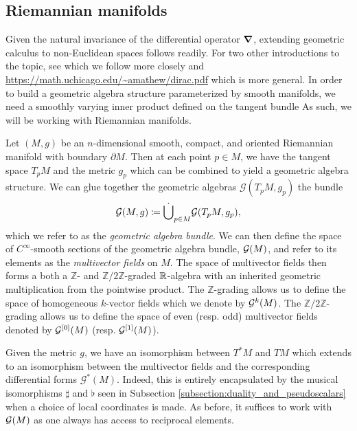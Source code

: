 \documentclass[12pt]{article}
\begin{document}

\subsection{Riemannian manifolds}


Given the natural invariance of the differential operator $\boldsymbol{\nabla}$, extending geometric calculus to non-Euclidean spaces follows readily.  For two other introductions to the topic, see \cite{schindler_geometric_2020} which we follow more closely and \url{https://math.uchicago.edu/~amathew/dirac.pdf} which is more general. In order to build a geometric algebra structure parameterized by smooth manifolds, we need a smoothly varying inner product defined on the tangent bundle  As such, we will be working with Riemannian manifolds.

Let $(M,g)$ be an $n$-dimensional smooth, compact, and oriented Riemannian manifold with boundary $\partial M$.  Then at each point  $p\in M$, we have the tangent space $T_pM$ and the metric $g_p$ which can be combined to yield a geometric algebra structure. We can glue together the geometric algebras $\mathcal{G}(T_pM,g_p)$ the bundle
\[
\mathcal{G}(M,g) \coloneqq \dot{\bigcup}_{p\in M} \mathcal{G} (T_pM,g_p),
\]
which we refer to as the \emph{geometric algebra bundle}.  We can then define the space of $C^\infty$-smooth sections of the geometric algebra bundle, $\mathcal{G}(M)$, and refer to its elements as the \emph{multivector fields} on $M$. The space of multivector fields then forms a both a $\mathbb{Z}$- and $\mathbb{Z}/2\mathbb{Z}$-graded $\mathbb{R}$-algebra with an inherited geometric multiplication from the pointwise product. The $\mathbb{Z}$-grading allows us to define the space of homogeneous $k$-vector fields which we denote by $\mathcal{G}^{k}(M)$.  The $\mathbb{Z}/2\mathbb{Z}$-grading allows us to define the space of even (resp. odd) multivector fields denoted by $\mathcal{G}^{[0]}(M)$ (resp. $\mathcal{G}^{[1]}(M)$).

Given the metric $g$, we have an isomorphism between $T^*M$ and $TM$ which extends to an isomorphism between the multivector fields and the corresponding differential forms $\mathcal{G}^*(M)$.  Indeed, this is entirely encapsulated by the musical isomorphisms $\sharp$ and $\flat$ seen in Subsection \ref{subsection:duality_and_pseudoscalars} when a choice of local coordinates is made. As before, it suffices to work with $\mathcal{G}(M)$ as one always has access to reciprocal elements. 
\end{document}
